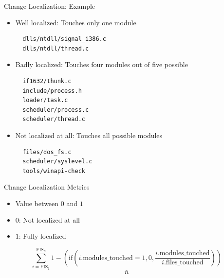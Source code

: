 
\begin{frame}[containsverbatim]{Change Localization: Example}
  \begin{itemize}
  \item Well localized: Touches only one module
\begin{verbatim}
  dlls/ntdll/signal_i386.c
  dlls/ntdll/thread.c
\end{verbatim}
  \item Badly localized: Touches four modules out of five possible
\begin{verbatim}
  if1632/thunk.c
  include/process.h
  loader/task.c
  scheduler/process.c
  scheduler/thread.c
\end{verbatim}
  \item Not localized at all: Touches all possible modules
\begin{verbatim}
  files/dos_fs.c
  scheduler/syslevel.c
  tools/winapi-check  
\end{verbatim}
  \end{itemize}
\end{frame}


\begin{frame}{Change Localization Metrics}
  \begin{itemize}
  \item Value between $0$ and $1$
  \item $0$: Not localized at all
  \item $1$: Fully localized
  \end{itemize}


  \[
  \underline{\sum_{i = \text{FIS}_1}^{\text{FIS}_n} 1 -
    \left(\text{if}\left( i.\text{modules\_touched} = 1, 0,
        \frac{i.\text{modules\_touched}}{i.\text{files\_touched}}
      \right) \right)}
  \]
  \[
  n
  \]
\end{frame}

